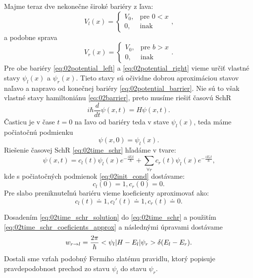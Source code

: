 Majme teraz dve nekonečne široké bariéry z ľava:
\begin{equation}
 \label{eq:02potential_left}
 V_l(x)=
 \begin{cases}
    V_0,& \text{pre } 0<x\\
    0,              & \text{inak}
\end{cases}\text{,}
\end{equation}
a podobne sprava
 \begin{equation}
 \label{eq:02potential_right}
 V_r(x)=
 \begin{cases}
    V_0,& \text{pre } b>x\\
    0,              & \text{inak}
\end{cases}\text{.}
\end{equation}
Pre obe bariéry \eqref{eq:02potential_left} a \eqref{eq:02potential_right} vieme určiť 
vlastné stavy $\psi_{l}(x)$ a $\psi_{r}(x)$. Tieto stavy sú očividne dobrou aproximáciou 
stavov naľavo a napravo od konečnej bariéry \eqref{eq:02potential_barrier}. Nie sú to však 
vlastné stavy hamiltoniánu \eqref{eq:02barrier}, preto musíme riešiť časovú SchR 
\begin{equation}
 \label{eq:02time_schr}
 i\hbar \frac{d}{dt}\psi(x,t)=\hat{H} \psi(x,t)\text{.}
\end{equation} 
Časticu je v čase $t=0$ na ľavo od bariéry teda v stave $\psi_l(x)$, teda máme počiatočnú 
podmienku 
\begin{equation}
 \label{eq:02init_cond} 
 \psi(x,0)=\psi_l(x)\text{.}
\end{equation}
Riešenie časovej SchR \eqref{eq:02time_schr} hľadáme v tvare:
\begin{equation}
 \label{eq:02time_schr_solution}
 \psi(x,t)=c_l(t)\psi_l(x)e^{-\frac{iE_l t}{\hbar}}+\sum_{\forall r} c_r(t)\psi_l(x)e^{-\frac{iE_r t}
{\hbar}}\text{,}
\end{equation}  
kde s počiatočných podmienok \eqref{eq:02init_cond} dostávame:
\begin{equation}
 \label{eq:02time_schr_coeficients} 
c_l(0)=1 , c_r(0)=0 \text{.}
 \end{equation} 
 Pre slabo preniknuteľnú bariéru vieme koeficienty aproximovať ako:
 \begin{equation}
 \label{eq:02time_schr_coeficients_approx} 
c_l(t)\doteq1,c_l'(t)\doteq1 , c_r(t)\doteq0 \text{.}
 \end{equation} 
 
Dosadením \eqref{eq:02time_schr_solution}  do \eqref{eq:02time_schr} a použitím 
\eqref{eq:02time_schr_coeficients_approx} 
a následnými úpravami  dostávame
\begin{equation}
 \label{eq:02golden_rule}
 w_{r\to l}=\frac{2\pi}{\hbar} <\psi_l|H-E_l|\psi_r>\delta(E_l-E_r)\text{.}
\end{equation} 
Dostali sme vzťah podobný Fermiho zlatému pravidlu, ktorý popisuje pravdepodobnost 
prechod zo stavu $\psi_l$  do stavu $\psi_r$. 


